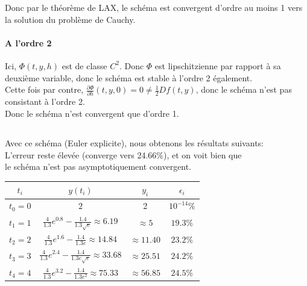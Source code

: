 \documentclass[a4paper,12pt,landscape]{article}
\begin{document}
Donc par le théorème de LAX, le schéma est convergent d'ordre au moins 1 vers la solution du problème de Cauchy.

\paragraph{A l'ordre 2}
Ici, $\Phi(t,y,h)$ est de classe $C^2$. Donc $\Phi$ est lipschitzienne par rapport à sa deuxième variable, donc le schéma est stable à l'ordre 2 également.\\
Cette fois par contre, $\frac{\partial \Phi}{\partial h} (t,y,0)=0 \neq \frac{1}{2}Df(t,y)$, donc le schéma n'est pas consistant à l'ordre 2.\\
Donc le schéma n'est convergent que d'ordre 1.

\subsection{}

Avec ce schéma (Euler explicite), nous obtenons les résultats suivants:\\
L'erreur reste élevée (converge vers 24.66\%), et on voit bien que\\ le schéma n'est pas asymptotiquement convergent.

\begin{table}[h]
\hspace{2cm}
\begin{tabular}{|c|c|c|c|}
\hline
	$t_i$ & $y(t_i)$ & $y_i$ & $\epsilon_i$ \\
\hline
	$t_0=0$ & $2$ & 2 & $10^{-14}\%$ \\
\hline
	$t_1=1$ & $\frac{4}{1.3}e^{0.8} -\frac{1.4}{1.3\sqrt{e}}\approx 6.19$ & $\approx 5$ & $19.3\%$ \\
\hline
	$t_2=2$ & $\frac{4}{1.3}e^{1.6} -\frac{1.4}{1.3e}\approx 14.84$ & $\approx 11.40$  & $23.2\%$ \\
\hline
	$t_3=3$ & $\frac{4}{1.3}e^{2.4} -\frac{1.4}{1.3e\sqrt{e}}\approx 33.68$& $\approx 25.51$ & $24.2\%$ \\
\hline
	$t_4=4$ & $\frac{4}{1.3}e^{3.2} -\frac{1.4}{1.3e^2}\approx 75.33$ & $ \approx 56.85$  & $24.5\%$ \\
\hline
\end{tabular}
\end{table}
\end{document}
